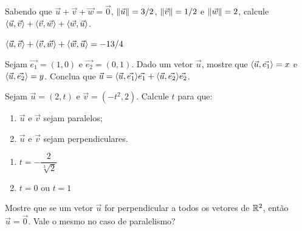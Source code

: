 \documentclass[12pt]{exam}
\begin{document}
\questao{} Sabendo que $\vec{u} + \vec{v} + \vec{w} = \vec{0}$, $\left\Vert{\vec{u}}\right\Vert = 3/2$, $\left\Vert{\vec{v}}\right\Vert = 1/2$ e $\left\Vert{\vec{w}}\right\Vert = 2$, calcule $\langle \vec{u}, \vec{v} \rangle + \langle \vec{v}, \vec{w} \rangle + \langle \vec{w}, \vec{u} \rangle$.
\begin{solucao}
    $\langle \vec{u}, \vec{v} \rangle + \langle \vec{v}, \vec{w} \rangle + \langle \vec{w}, \vec{u} \rangle = -13/4$
\end{solucao}

\vspace{.3cm}

\questao{} Sejam $\vec{e_1} = (1, 0)$ e $\vec{e_2} = (0, 1)$. Dado um vetor $\vec{u}$, mostre que $\langle \vec{u}, \vec{e_1} \rangle = x$ e $\langle \vec{u}, \vec{e_2} \rangle = y$. Conclua que $\vec{u} = \langle \vec{u}, \vec{e_1} \rangle\vec{e_1} + \langle \vec{u}, \vec{e_2} \rangle\vec{e_2}$.

\vspace{.3cm}

\questao{} Sejam $\vec{u} = (2, t)$ e $\vec{v} = (-t^2, 2)$. Calcule $t$ para que:
\begin{enumerate}[label=({\alph*})]
    \item $\vec{u}$ e $\vec{v}$ sejam paralelos;
    \item $\vec{u}$ e $\vec{v}$ sejam perpendiculares.
\end{enumerate}
\begin{solucao}
    \begin{enumerate}[label=({\alph*})]
        \item $t = -\dfrac{2}{\sqrt[3]{2}}$
        \item $t = 0$ ou $t = 1$
    \end{enumerate}
\end{solucao}

\vspace{.3cm}

\questao{} Mostre que se um vetor $\vec{u}$ for perpendicular a todos os vetores de $\mathbb{R}^2$, então $\vec{u} = \vec{0}$. Vale o mesmo no caso de paralelismo?

\vspace{.3cm}
\end{document}

